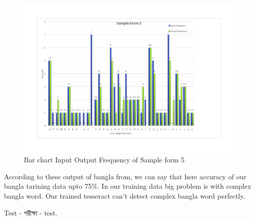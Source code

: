 \begin{figure}[H]
\centering
\includegraphics[width=1\textwidth]{Bform5.pdf}
\caption {Bar chart Input Output Frequency of Sample form 5}
\label {fig:Bbar5}
\end{figure}

According to these output of bangla from, we can say that here accuracy of our bangla tarining data upto 75\%. In our training data big problem is with complex bangla word. Our trained tesseract can't detect complex bangla word perfectly.

Test - {\bengalifont পরীক্ষা} - test.